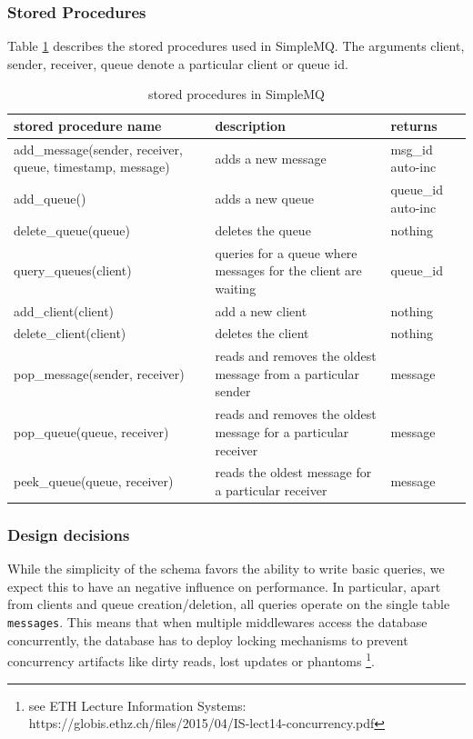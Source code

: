 \documentclass[11pt]{article}
\begin{document}
\subsubsection{Stored Procedures}\label{sec:stored-procedures}
Table \ref{tab:storedprocedures} describes the stored procedures used in SimpleMQ. The arguments client, sender, receiver, queue denote a particular client or queue id.
\begin{table}[ht]
  \caption{stored procedures in SimpleMQ}
  \label{tab:storedprocedures}
  \begin{center}
    \begin{tabular}{|p{5cm}|p{6cm}|p{1.8cm}|}
       \hline
       \textbf{stored procedure name} & \textbf{description} & \textbf{returns}\\ \hline
       add\_message(sender, receiver, queue, timestamp, message) & adds a new message & msg\_id auto-inc\\ \hline
       add\_queue() & adds a new queue & queue\_id auto-inc\\ \hline
       delete\_queue(queue) & deletes the queue & nothing\\ \hline
       query\_queues(client) & queries for a queue where messages for the client are waiting & queue\_id\\ \hline
       add\_client(client) & add a new client & nothing\\ \hline
       delete\_client(client) & deletes the client & nothing\\ \hline
       pop\_message(sender, receiver) & reads and removes the oldest message from a particular sender & message\\ \hline
       pop\_queue(queue, receiver) & reads and removes the oldest message for a particular receiver & message\\ \hline
       peek\_queue(queue, receiver) & reads the oldest message for a particular receiver & message\\ \hline
    \end{tabular}
  \end{center}
\end{table}
\subsubsection{Design decisions}\label{sec:design-decisions}
While the simplicity of the schema favors the ability to write basic queries, we expect this to have an negative influence on performance.
In particular, apart from clients and queue creation/deletion, all queries operate on the single table \texttt{messages}. This means that when multiple middlewares access the database concurrently, the database has to deploy locking mechanisms to prevent concurrency artifacts like dirty reads, lost updates or phantoms \footnote{see ETH Lecture Information Systems: https://globis.ethz.ch/files/2015/04/IS-lect14-concurrency.pdf}.
\end{document}
